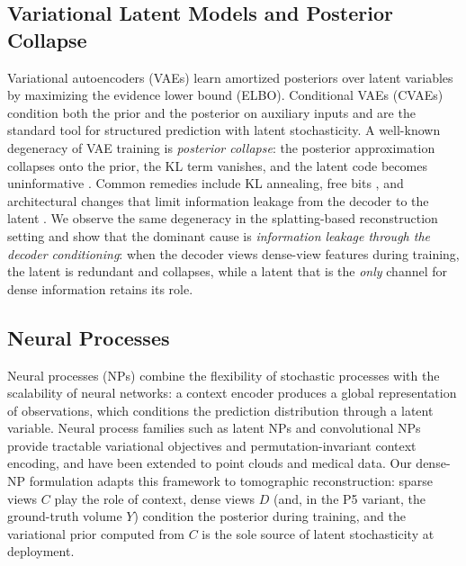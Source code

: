 \subsection{Variational Latent Models and Posterior Collapse}
\label{sec:rel:vae}

Variational autoencoders (VAEs) \cite{kingma2014vae} learn amortized
posteriors over latent variables by maximizing the evidence lower bound
(ELBO). Conditional VAEs (CVAEs) \cite{sohn2015cvae} condition both the
prior and the posterior on auxiliary inputs and are the standard tool
for structured prediction with latent stochasticity. A well-known
degeneracy of VAE training is \emph{posterior collapse}: the posterior
approximation collapses onto the prior, the KL term vanishes, and the
latent code becomes uninformative \cite{bowman2016generating,
lucas2019donot}. Common remedies include KL
annealing, free bits \cite{kingma2016freebits}, and architectural
changes that limit information leakage from the decoder to the latent
\cite{zhao2019infovae, dieng2019avoiding}. We observe the same
degeneracy in the splatting-based reconstruction setting and show that
the dominant cause is \emph{information leakage through the decoder
conditioning}: when the decoder views dense-view features during
training, the latent is redundant and collapses, while a latent that is
the \emph{only} channel for dense information retains its role.

\subsection{Neural Processes}
\label{sec:rel:np}

Neural processes (NPs) \cite{garnelo2018neural} combine the flexibility
of stochastic processes with the scalability of neural networks: a
context encoder produces a global representation of observations, which
conditions the prediction distribution through a latent variable. Neural
process families such as latent NPs \cite{garnelo2018latent} and
convolutional NPs \cite{gordon2019convolutional} provide tractable
variational objectives and permutation-invariant context encoding, and
have been extended to point clouds and medical data. Our dense-NP
formulation adapts this framework to tomographic reconstruction: sparse
views $C$ play the role of context, dense views $D$ (and, in the P5
variant, the ground-truth volume $Y$) condition the posterior during
training, and the variational prior computed from $C$ is the sole source
of latent stochasticity at deployment.

